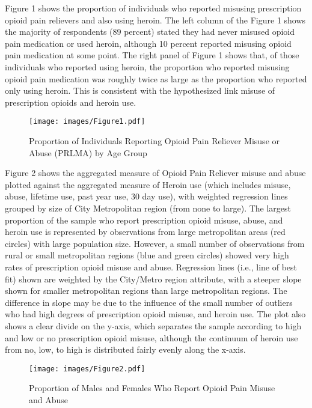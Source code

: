 \documentclass[sigconf]{acmart}
\begin{document}
Figure 1 shows the proportion of individuals who reported misusing prescription 
opioid pain relievers and also using heroin. The left column of the Figure 1 
shows the majority of respondents (89 percent) stated they had never misused 
opioid pain medication or used heroin, although 10 percent reported misusing 
opioid pain medication at some point. The right panel of Figure 1 shows that, 
of those individuals who reported using heroin, the proportion who reported 
misusing opioid pain medication was roughly twice as large as the proportion 
who reported only using heroin. This is consistent with the hypothesized 
link misuse of prescription opioids and heroin use.

\begin{figure}[!ht]
  \centering\texttt{[image: images/Figure1.pdf]}
  \caption{Proportion of Individuals Reporting Opioid Pain Reliever Misuse 
  or Abuse (PRLMA) by Age Group}
  \label{f:Figure1}
\end{figure}


Figure 2 shows the aggregated measure of Opioid Pain Reliever misuse and abuse 
plotted against the aggregated measure of Heroin use (which includes misuse, 
abuse, lifetime use, past year use, 30 day use), with weighted regression 
lines grouped by size of City Metropolitan region (from none to large). 
The largest proportion of the sample who report prescription opioid misuse, 
abuse, and heroin use is represented by observations from large metropolitan 
areas (red circles) with large population size. However, a small number of
observations from rural or small metropolitan regions (blue and green circles)
showed very high rates of prescription opioid misuse and abuse. Regression 
lines (i.e., line of best fit) shown are weighted by the City/Metro
region attribute, with a steeper slope shown for smaller metropolitan regions 
than large metropolitan regions. The difference in slope may be due to the 
influence of the small number of outliers who had high degrees of prescription 
opioid misuse, and heroin use. The plot also shows a clear divide on the y-axis,
which separates the sample according to high and low or no prescription opioid 
misuse, although the continuum of heroin use from no, low, to high is 
distributed fairly evenly along the x-axis. 

\begin{figure}[!ht]
  \centering\texttt{[image: images/Figure2.pdf]}
  \caption{Proportion of Males and Females Who Report Opioid Pain Misuse 
  and Abuse}
  \label{f:Figure2}
\end{figure}
\end{document}
